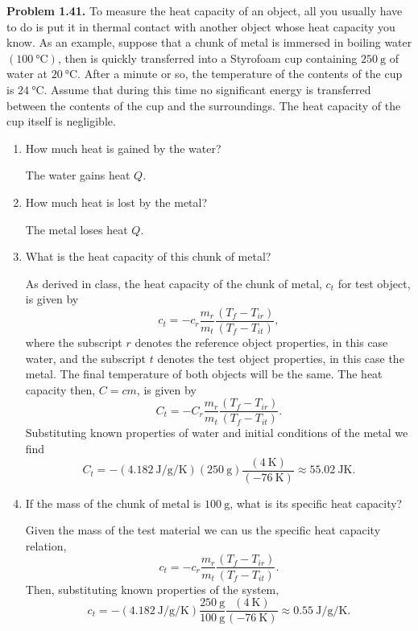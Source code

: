 \documentclass[a4paper, 12pt]{config/homework}
\begin{document}
\pagebreak\noindent
\textbf{Problem 1.41.} To measure the heat capacity of an object, all you usually have to do is put it in thermal contact with another object whose heat capacity you know. As an example, suppose that a chunk of metal is immersed in boiling water \((\qty{100}{\celsius})\), then is quickly transferred into a Styrofoam cup containing \(\qty{250}{\gram}\) of water at \(\qty{20}{\celsius}\). After a minute or so, the temperature of the contents of the cup is \(\qty{24}{\celsius}\). Assume that during this time no significant energy is transferred between the contents of the cup and the surroundings. The heat capacity of the cup itself is negligible.
\begin{enumerate}[label=\textbf{(\alph*)}]
\item How much heat is gained by the water?

The water gains heat \(Q\).
\item How much heat is lost by the metal?

The metal loses heat \(Q\).
\item What is the heat capacity of this chunk of metal?

As derived in class, the heat capacity of the chunk of metal, \(c_t\) for test object, is given by
\[c_t = -c_r \frac{m_r}{m_t}\frac{\left(T_f - T_{ir}\right)}{\left(T_f - T_{it}\right)},\]
where the subscript \(r\) denotes the reference object properties, in this case water, and the subscript \(t\) denotes the test object properties, in this case the metal. The final temperature of both objects will be the same. The heat capacity then, \(C=cm\), is given by
\[C_t = - C_r \frac{m_r}{m_t}\frac{\left(T_f - T_{ir}\right)}{\left(T_f - T_{it}\right)}.\]
Substituting known properties of water and initial conditions of the metal we find
\[C_t = -\left(\qty{4.182}{\joule\per\gram\per\kelvin}\right)\left(\qty{250}{\gram}\right)\frac{\left(\qty{4}{\kelvin}\right)}{\left(\qty{-76}{\kelvin}\right)} \approx \qty{55.02}{\joule\kelvin}.\]
\item If the mass of the chunk of metal is \(\qty{100}{\gram}\), what is its specific heat capacity?

Given the mass of the test material we can us the specific heat capacity relation,
\[c_t = -c_r \frac{m_r}{m_t}\frac{\left(T_f - T_{ir}\right)}{\left(T_f - T_{it}\right)}.\]
Then, substituting known properties of the system,
\[c_t = -\left(\qty{4.182}{\joule\per\gram\per\kelvin}\right)\frac{\qty{250}{\gram}}{\qty{100}{\gram}}\frac{\left(\qty{4}{\kelvin}\right)}{\left(\qty{-76}{\kelvin}\right)} \approx \qty{0.55}{\joule\per\gram\per\kelvin}.\]
\end{enumerate}
\end{document}

